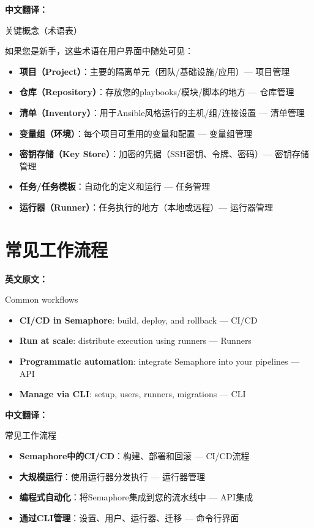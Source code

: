 \documentclass[12pt,UTF8]{ctexbook}
\begin{document}
\textbf{中文翻译：}

关键概念（术语表）

如果您是新手，这些术语在用户界面中随处可见：

\begin{itemize}[leftmargin=3.5em]
    \item \textbf{项目（Project）}：主要的隔离单元（团队/基础设施/应用）— 项目管理
    \item \textbf{仓库（Repository）}：存放您的playbooks/模块/脚本的地方 — 仓库管理
    \item \textbf{清单（Inventory）}：用于Ansible风格运行的主机/组/连接设置 — 清单管理
    \item \textbf{变量组（环境）}：每个项目可重用的变量和配置 — 变量组管理
    \item \textbf{密钥存储（Key Store）}：加密的凭据（SSH密钥、令牌、密码）— 密钥存储管理
    \item \textbf{任务/任务模板}：自动化的定义和运行 — 任务管理
    \item \textbf{运行器（Runner）}：任务执行的地方（本地或远程）— 运行器管理
\end{itemize}

\section{常见工作流程}

\textbf{英文原文：}

Common workflows 

\begin{itemize}[leftmargin=3.5em]
    \item \textbf{CI/CD in Semaphore}: build, deploy, and rollback — CI/CD 
    \item \textbf{Run at scale}: distribute execution using runners — Runners 
    \item \textbf{Programmatic automation}: integrate Semaphore into your pipelines — API 
    \item \textbf{Manage via CLI}: setup, users, runners, migrations — CLI
\end{itemize}

\textbf{中文翻译：}

常见工作流程

\begin{itemize}[leftmargin=3.5em]
    \item \textbf{Semaphore中的CI/CD}：构建、部署和回滚 — CI/CD流程
    \item \textbf{大规模运行}：使用运行器分发执行 — 运行器管理
    \item \textbf{编程式自动化}：将Semaphore集成到您的流水线中 — API集成
    \item \textbf{通过CLI管理}：设置、用户、运行器、迁移 — 命令行界面
\end{itemize}
\end{document}
